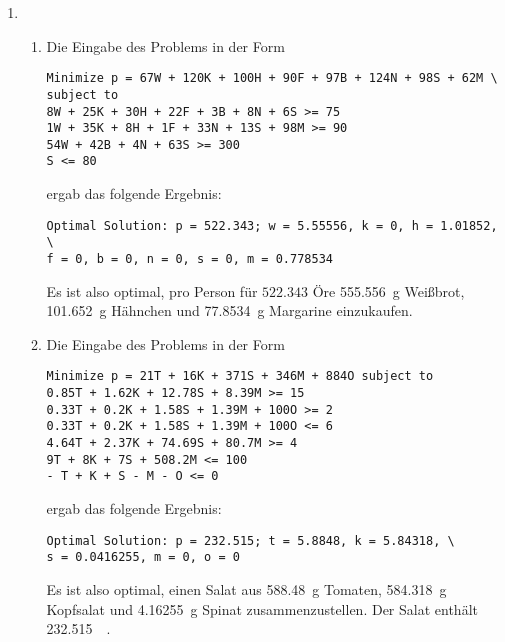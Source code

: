 \documentclass[a4paper]{scrartcl}
\begin{document}
\begin{enumerate}[label=\bfseries\arabic*.]
\begin{enumerate}
            \item

        \end{enumerate}

    \item
        \begin{enumerate}
            \item
                Die Eingabe des Problems in der Form
                \begin{verbatim}
Minimize p = 67W + 120K + 100H + 90F + 97B + 124N + 98S + 62M \
subject to
8W + 25K + 30H + 22F + 3B + 8N + 6S >= 75
1W + 35K + 8H + 1F + 33N + 13S + 98M >= 90
54W + 42B + 4N + 63S >= 300
S <= 80 \end{verbatim}
                ergab das folgende Ergebnis:
                \begin{verbatim}
Optimal Solution: p = 522.343; w = 5.55556, k = 0, h = 1.01852, \
f = 0, b = 0, n = 0, s = 0, m = 0.778534 \end{verbatim}
                Es ist also optimal, pro Person für $522.343$ Öre
                \SI{555,556}{\gram} Weißbrot, \SI{101,652}{\gram} Hähnchen
                und \SI{77,8534}{\gram} Margarine einzukaufen.

            \item
                Die Eingabe des Problems in der Form
                \begin{verbatim}
Minimize p = 21T + 16K + 371S + 346M + 884O subject to
0.85T + 1.62K + 12.78S + 8.39M >= 15
0.33T + 0.2K + 1.58S + 1.39M + 100O >= 2
0.33T + 0.2K + 1.58S + 1.39M + 100O <= 6
4.64T + 2.37K + 74.69S + 80.7M >= 4
9T + 8K + 7S + 508.2M <= 100
- T + K + S - M - O <= 0 \end{verbatim}
                ergab das folgende Ergebnis:
                \begin{verbatim}
Optimal Solution: p = 232.515; t = 5.8848, k = 5.84318, \
s = 0.0416255, m = 0, o = 0 \end{verbatim}
                Es ist also optimal, einen Salat aus \SI{588,48}{\gram} Tomaten,
                \SI{584,318}{\gram} Kopfsalat und \SI{4,16255}{\gram} Spinat
                zusammenzustellen.
                Der Salat enthält \SI{232,515}{\kilo\calorie}.


\end{enumerate}
\end{enumerate}
\end{document}
